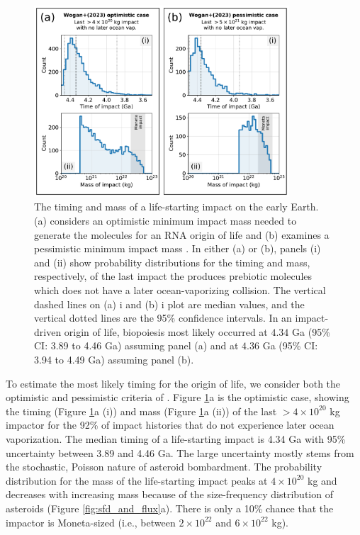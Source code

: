 \documentclass{aastex631}
\begin{document}
\begin{figure}
  \centering
  \includegraphics[width=0.85\textwidth]{figures/timing_and_mass.pdf}
  \caption{The timing and mass of a life-starting impact on the early Earth. (a) considers an optimistic minimum impact mass needed to generate the molecules for an RNA origin of life and (b) examines a pessimistic minimum impact mass \citep{Wogan_2023}. In either (a) or (b), panels (i) and (ii) show probability distributions for the timing and mass, respectively, of the last impact the produces prebiotic molecules which does not have a later ocean-vaporizing collision. The vertical dashed lines on (a) i and (b) i plot are median values, and the vertical dotted lines are the 95\% confidence intervals. In an impact-driven origin of life, biopoiesis most likely occurred at $4.34$ Ga (95\% CI: 3.89 to 4.46 Ga) assuming panel (a) and at $4.36$ Ga (95\% CI: 3.94 to 4.49 Ga) assuming panel (b).}
  \label{fig:time_and_mass}
\end{figure}

To estimate the most likely timing for the origin of life, we consider both the optimistic and pessimistic criteria of \citet{Wogan_2023}. Figure \ref{fig:time_and_mass}a is the optimistic case, showing the timing (Figure \ref{fig:time_and_mass}a (i)) and mass (Figure \ref{fig:time_and_mass}a (ii)) of the last $> 4 \times 10^{20}$ kg impactor for the 92\% of impact histories that do not experience later ocean vaporization. The median timing of a life-starting impact is 4.34 Ga with 95\% uncertainty between 3.89 and 4.46 Ga. The large uncertainty mostly stems from the stochastic, Poisson nature of asteroid bombardment. The probability distribution for the mass of the life-starting impact peaks at $4 \times 10^{20}$ kg and decreases with increasing mass because of the size-frequency distribution of asteroids (Figure \ref{fig:sfd_and_flux}a). There is only a 10\% chance that the impactor is Moneta-sized (i.e., between $2 \times 10^{22}$ and $6 \times 10^{22}$ kg).
\end{document}
